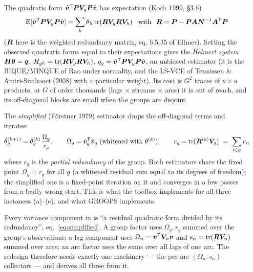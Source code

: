 The quadratic form $\hat{\bm{v}}^{\mathsf T}\bm{P}\bm{V}_g\bm{P}\hat{\bm{v}}$ has expectation (Koch 1999, §3.6)
\begin{equation}
\operatorname{E}[\hat{\bm{v}}^{\mathsf T}\bm{P}\bm{V}_g\bm{P}\hat{\bm{v}}] = \sum_{h} \theta_h \operatorname{tr}(\bm{R}\bm{V}_g\bm{R}\bm{V}_h)\,\ \ \text{with}\ \ \bm{R} = \bm{P} - \bm{P}\bm{A}\bm{N}^{-1}\bm{A}^{\mathsf T}\bm{P}
\label{eq:helmert-expect}
\end{equation}
($\bm{R}$ here is the weighted redundancy matrix, eq. 6.5.35 of Ellmer). Setting the observed quadratic forms equal to their expectations gives the \emph{Helmert system} $\bm{H}\bm{\theta} = \bm{q}$, $H_{gh} = \operatorname{tr}(\bm{R}\bm{V}_g\bm{R}\bm{V}_h)$, $q_g = \hat{\bm{v}}^{\mathsf T}\bm{P}\bm{V}_g\bm{P}\hat{\bm{v}}$, an unbiased estimator (it is the BIQUE/MINQUE of Rao under normality, and the LS-VCE of Teunissen \& Amiri-Simkooei (2008) with a particular weight). Its cost is $G^2$ traces of $u\times u$ products; at $G$ of order thousands (lags $\times$ streams $\times$ arcs) it is out of reach, and its off-diagonal blocks are small when the groups are disjoint.

The \emph{simplified} (Förstner 1979) estimator drops the off-diagonal terms and iterates:
\begin{equation}
\hat\theta_g^{(k+1)} = \theta_g^{(k)}\,\frac{\Omega_g}{r_g}, \qquad
\Omega_g = \bar{\bm{v}}_g^{\mathsf T}\bar{\bm{v}}_g\ (\text{whitened with }\theta^{(k)}), \qquad
r_g = \operatorname{tr}(\bm{R}^{(k)}\bm{V}_g)\ =\ \sum_{i\in g} r_i ,
\label{eq:simplified}
\end{equation}
where $r_g$ is the \emph{partial redundancy} of the group. Both estimators share the fixed point $\Omega_g = r_g$ for all $g$ (a whitened residual sum equal to its degrees of freedom); the simplified one is a fixed-point iteration on it and converges in a few passes from a badly wrong start. This is what the toolbox implements for all three instances (a)--(c), and what GROOPS implements.

\begin{principle}
Every variance component in \lsq{} is ``a residual quadratic form divided by its redundancy'', eq.~\eqref{eq:simplified}. A group factor uses $\Omega_g, r_g$ summed over the group's observations; a lag component uses $\Omega_n = \bar{\bm{v}}^{\mathsf T}\bm{V}_n\bar{\bm{v}}$ and $s_n = \operatorname{tr}(\bm{R}\bm{V}_n)$ summed over arcs; an arc factor uses the sums over all lags of one arc. The redesign therefore needs exactly one machinery --- the per-arc $(\Omega_n, s_n)$ collectors --- and derives all three from it.
\end{principle}

